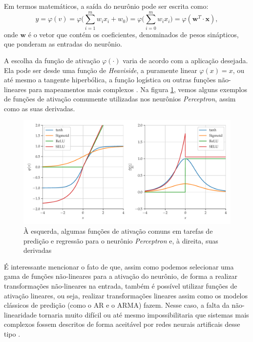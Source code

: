 \documentclass[a4paper, 12pt]{article}
\begin{document}
Em termos matemáticos, a saída do neurônio pode ser escrita como:
\begin{equation}\label{eq:mlp-out}
y = \varphi(v) = \varphi  \Big(\sum_{i=1}^{m}w_i x_i + w_0 \Big) = \varphi \Big(\sum_{i=0}^{m}w_i x_i \Big) = \varphi (\mathbf{w}^T \cdot \mathbf{x}),
\end{equation}
onde $\mathbf{w}$ é o vetor que contém os coeficientes, denominados de pesos sinápticos, que ponderam as entradas do neurônio. 

A escolha da função de ativação $\varphi (\cdot)$ varia de acordo com a aplicação desejada. Ela pode ser desde uma função de \textit{Heaviside}, a puramente linear $\varphi(x) = x$, ou até mesmo a tangente hiperbólica, a função logística ou outras funções não-lineares para mapeamentos mais complexos \cite{geron2019hands}. Na figura \ref{fig:mlp-activations}, vemos alguns exemplos de funções de ativação comumente utilizadas nos neurônios \textit{Perceptron}, assim como as suas derivadas. 

\begin{figure}[!ht]
	\centering
	\includegraphics[scale = 0.7]{mlp-activations.pdf}
	\caption{À esquerda, algumas funções de ativação comuns em tarefas de predição e regressão para o neurônio \textit{Perceptron} e, à direita, suas derivadas}
	\label{fig:mlp-activations}
\end{figure}

É interessante mencionar o fato de que, assim como podemos selecionar uma gama de funções não-lineares para a ativação do neurônio, de forma a realizar transformações não-lineares na entrada, também é possível utilizar funções de ativação lineares, ou seja, realizar transformações lineares assim como os modelos clássicos de predição (como o AR e o ARMA) fazem. Nesse caso, a falta da não-linearidade tornaria muito difícil ou até mesmo impossibilitaria que sistemas mais complexos fossem descritos de forma aceitável por redes neurais artificais desse tipo \cite{hornik1989multilayer}.
\end{document}
